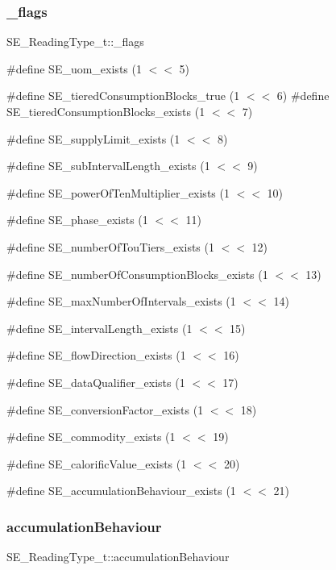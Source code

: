 \subsubsection{\texorpdfstring{\+\_\+flags}{\_flags}}
{\footnotesize\ttfamily S\+E\+\_\+\+Reading\+Type\+\_\+t\+::\+\_\+flags}

\#define S\+E\+\_\+uom\+\_\+exists (1 $<$$<$ 5)

\#define S\+E\+\_\+tiered\+Consumption\+Blocks\+\_\+true (1 $<$$<$ 6) \#define S\+E\+\_\+tiered\+Consumption\+Blocks\+\_\+exists (1 $<$$<$ 7)

\#define S\+E\+\_\+supply\+Limit\+\_\+exists (1 $<$$<$ 8)

\#define S\+E\+\_\+sub\+Interval\+Length\+\_\+exists (1 $<$$<$ 9)

\#define S\+E\+\_\+power\+Of\+Ten\+Multiplier\+\_\+exists (1 $<$$<$ 10)

\#define S\+E\+\_\+phase\+\_\+exists (1 $<$$<$ 11)

\#define S\+E\+\_\+number\+Of\+Tou\+Tiers\+\_\+exists (1 $<$$<$ 12)

\#define S\+E\+\_\+number\+Of\+Consumption\+Blocks\+\_\+exists (1 $<$$<$ 13)

\#define S\+E\+\_\+max\+Number\+Of\+Intervals\+\_\+exists (1 $<$$<$ 14)

\#define S\+E\+\_\+interval\+Length\+\_\+exists (1 $<$$<$ 15)

\#define S\+E\+\_\+flow\+Direction\+\_\+exists (1 $<$$<$ 16)

\#define S\+E\+\_\+data\+Qualifier\+\_\+exists (1 $<$$<$ 17)

\#define S\+E\+\_\+conversion\+Factor\+\_\+exists (1 $<$$<$ 18)

\#define S\+E\+\_\+commodity\+\_\+exists (1 $<$$<$ 19)

\#define S\+E\+\_\+calorific\+Value\+\_\+exists (1 $<$$<$ 20)

\#define S\+E\+\_\+accumulation\+Behaviour\+\_\+exists (1 $<$$<$ 21) \mbox{\label{group__ReadingType_ga4ed3a5e9fe3ab6c2ea585504d1d6a239}} 
\subsubsection{\texorpdfstring{accumulation\+Behaviour}{accumulationBehaviour}}
{\footnotesize\ttfamily S\+E\+\_\+\+Reading\+Type\+\_\+t\+::accumulation\+Behaviour}

